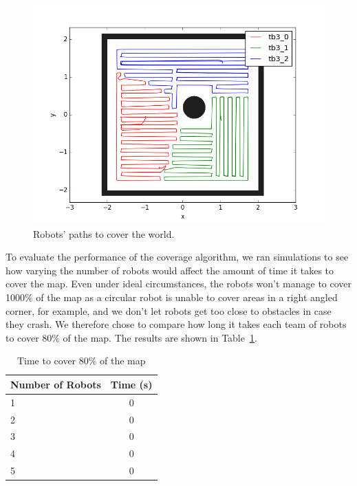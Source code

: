 \documentclass[a4paper, 10pt, conference]{ieeeconf}      %
\begin{document}
\begin{figure}
	\centering
	\includegraphics[width=\columnwidth]{ground_truth_coverage.png}
	\caption{Robots' paths to cover the world.}
	\label{fig:ground_truth_coverage}
\end{figure}

To evaluate the performance of the coverage algorithm, we ran simulations to see how varying the number of robots would affect the amount of time it takes to cover the map. Even under ideal circumstances, the robots won't manage to cover 1000\% of the map as a circular robot is unable to cover areas in a right angled corner, for example, and we don't let robots get too close to obstacles in case they crash. We therefore chose to compare how long it takes each team of robots to cover 80\% of the map. The results are shown in Table~\ref{tab:table1}. 

\begin{table}[h!]
  \begin{center}
    \caption{Time to cover 80\% of the map}
    \label{tab:table1}
    \begin{tabular}{|l|c|}
      \hline
      \textbf{Number of Robots} & \textbf{Time (s)} \\
      \hline
      1 & 0\\
      2 & 0\\
      3 & 0\\
      4 & 0\\
      5 & 0\\
      \hline
    \end{tabular}
  \end{center}
\end{table}
\end{document}
